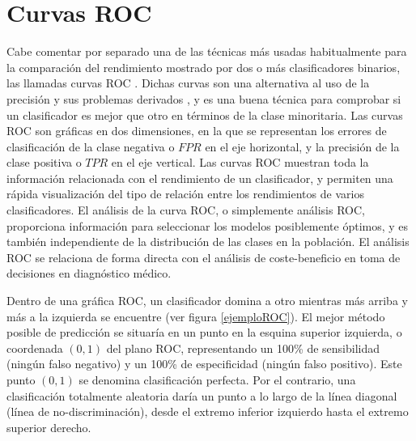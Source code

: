 \section{Curvas ROC}\label{curvasROC}
\noindent Cabe comentar por separado una de las técnicas más usadas habitualmente para
la comparación del rendimiento mostrado por dos o más clasificadores binarios, las
llamadas curvas
ROC \cite{Fawcett2006}. Dichas curvas son	una alternativa al
uso de la		precisión	y sus		problemas derivados \cite{Provost1997,Provost1998}, y
es	una buena	técnica para		comprobar si un
clasificador es mejor que	otro	en	términos de	la clase	minoritaria. Las curvas ROC son
gráficas en dos dimensiones, en la que se representan los errores de clasificación de la
clase negativa o $FPR$ en el eje horizontal, y la precisión de la clase positiva o
$TPR$ en el eje vertical. Las curvas ROC muestran
toda la información relacionada con el rendimiento de un clasificador, y permiten una
rápida visualización del tipo de relación entre los rendimientos de varios
clasificadores. El análisis de la curva ROC, o simplemente análisis ROC, proporciona
información para seleccionar los modelos posiblemente óptimos, y es también independiente
de la distribución de las clases en la población. El análisis ROC se relaciona de forma
directa con el análisis de coste-beneficio en toma de decisiones en diagnóstico médico.

Dentro de una gráfica ROC, un clasificador domina a otro mientras más arriba y más a la
izquierda se encuentre (ver figura \ref{ejemploROC}). El mejor método posible de
predicción se situaría en un punto en la esquina superior izquierda, o coordenada $(0,1)$
del plano ROC, representando un 100\% de sensibilidad (ningún falso negativo) y un 100\%  de
especificidad (ningún falso positivo). Este punto $(0,1)$ se denomina
clasificación perfecta. Por el contrario, una clasificación totalmente aleatoria daría
un punto a lo largo de la línea diagonal (línea de no-discriminación),
desde el extremo inferior izquierdo hasta el extremo superior derecho.

